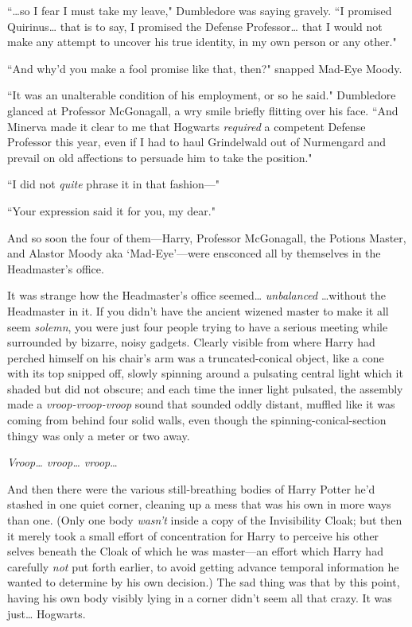 
``{\ldots}so I fear I must take my leave," Dumbledore was saying gravely. ``I promised Quirinus{\ldots} that is to say, I promised the Defense Professor{\ldots} that I would not make any attempt to uncover his true identity, in my own person or any other."

``And why'd you make a fool promise like that, then?" snapped Mad-Eye Moody.

``It was an unalterable condition of his employment, or so he said." Dumbledore glanced at Professor McGonagall, a wry smile briefly flitting over his face. ``And Minerva made it clear to me that Hogwarts \emph{required} a competent Defense Professor this year, even if I had to haul Grindelwald out of Nurmengard and prevail on old affections to persuade him to take the position."

``I did not \emph{quite} phrase it in that fashion—"

``Your expression said it for you, my dear."

And so soon the four of them—Harry, Professor McGonagall, the Potions Master, and Alastor Moody aka `Mad-Eye'—were ensconced all by themselves in the Headmaster's office.

It was strange how the Headmaster's office seemed{\ldots} \emph{unbalanced} {\ldots}without the Headmaster in it. If you didn't have the ancient wizened master to make it all seem \emph{solemn}, you were just four people trying to have a serious meeting while surrounded by bizarre, noisy gadgets. Clearly visible from where Harry had perched himself on his chair's arm was a truncated-conical object, like a cone with its top snipped off, slowly spinning around a pulsating central light which it shaded but did not obscure; and each time the inner light pulsated, the assembly made a \emph{vroop-vroop-vroop} sound that sounded oddly distant, muffled like it was coming from behind four solid walls, even though the spinning-conical-section thingy was only a meter or two away.

\emph{Vroop{\ldots} vroop{\ldots} vroop}{\ldots}

And then there were the various still-breathing bodies of Harry Potter he'd stashed in one quiet corner, cleaning up a mess that was his own in more ways than one. (Only one body \emph{wasn't} inside a copy of the Invisibility Cloak; but then it merely took a small effort of concentration for Harry to perceive his other selves beneath the Cloak of which he was master—an effort which Harry had carefully \emph{not} put forth earlier, to avoid getting advance temporal information he wanted to determine by his own decision.) The sad thing was that by this point, having his own body visibly lying in a corner didn't seem all that crazy. It was just{\ldots} Hogwarts.

